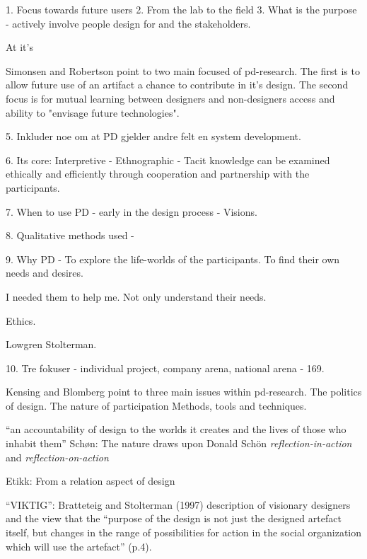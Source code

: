 1. Focus towards future users
2. From the lab to the field
3. What is the purpose - actively involve people design for and the stakeholders.

At it's

Simonsen and Robertson point to two main focused of pd-research. The first is to allow future use of an artifact a chance to contribute in it's design. The second focus is for mutual learning between designers and non-designers access and ability to "envisage future technologies"\cite[p.]{Simonsen2012Routledge}.

5. Inkluder noe om at PD gjelder andre felt en system development.

6. Its core: Interpretive - Ethnographic - Tacit knowledge can be examined ethically and efficiently through cooperation and partnership with the participants. 

7. When to use PD - early in the design process - Visions. 

8. Qualitative methods used - 

9. Why PD - 
	To explore the life-worlds of the participants. To find their own needs and desires. 

	I needed them to help me. Not only understand their needs. 


Ethics. 

Lowgren Stolterman.

10. Tre fokuser - individual project, company arena, national arena - 169. 

Kensing and Blomberg point to three main issues within pd-research. 
The politics of design.
The nature of participation
Methods, tools and techniques. 


``an accountability of design to the worlds it creates and the lives of those who inhabit them''
Schøn:
The  nature draws upon Donald Schön \textit{reflection-in-action} and \textit{reflection-on-action}

Etikk:
From a relation aspect of design 

``VIKTIG'':
Bratteteig and Stolterman (1997) description of visionary designers and the view that the “purpose of the design is not just the designed artefact itself, but changes in the range of possibilities for action in the social organization which will use the artefact” (p.4).